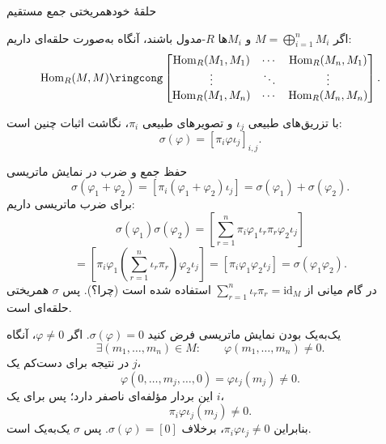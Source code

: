 \begin{frame}[t]{حلقهٔ خودهمریختی جمع مستقیم}
    \label{lec12:endomorphism-matrix}
    \begin{theorem}
        اگر $M=\bigoplus_{i=1}^{n}M_i$ و $M_i$ها $R$-مدول باشند، آنگاه
        به‌صورت حلقه‌ای داریم:
        \[
        \operatorname{Hom}_R(M,M)\ringcong
        \begin{bmatrix}
        \operatorname{Hom}_R(M_1,M_1)&\cdots&\operatorname{Hom}_R(M_n,M_1)\\
        \vdots&\ddots&\vdots\\
        \operatorname{Hom}_R(M_1,M_n)&\cdots&\operatorname{Hom}_R(M_n,M_n)
        \end{bmatrix}.
        \]
    \end{theorem}
    با تزریق‌های طبیعی $\iota_j$ و تصویرهای طبیعی $\pi_i$، نگاشت اثبات چنین است:
    \[
        \sigma(\varphi)=[\pi_i\varphi\iota_j]_{i,j}.
    \]
\end{frame}

\begin{frame}[t]{حفظ جمع و ضرب در نمایش ماتریسی}
    \label{lec12:matrix-homomorphism}
    \[
        \sigma(\varphi_1+\varphi_2)
        =[\pi_i(\varphi_1+\varphi_2)\iota_j]
        =\sigma(\varphi_1)+\sigma(\varphi_2).
    \]
    برای ضرب ماتریسی داریم:
    \[
        \sigma(\varphi_1)\sigma(\varphi_2)
        =\left[\sum_{r=1}^{n}\pi_i\varphi_1\iota_r\pi_r\varphi_2\iota_j\right]
    \]
    \[
        =\left[\pi_i\varphi_1
        \left(\sum_{r=1}^{n}\iota_r\pi_r\right)\varphi_2\iota_j\right]
        =[\pi_i\varphi_1\varphi_2\iota_j]
        =\sigma(\varphi_1\varphi_2).
    \]
    در گام میانی از $\sum_{r=1}^{n}\iota_r\pi_r=\mathrm{id}_M$ استفاده شده است (چرا؟).
    پس $\sigma$ همریختی حلقه‌ای است.
\end{frame}

\begin{frame}[t]{یک‌به‌یک بودن نمایش ماتریسی}
    \label{lec12:matrix-injectivity}
    فرض کنید $\sigma(\varphi)=0$. اگر $\varphi\ne0$، آنگاه
    \[
        \exists(m_1,\ldots,m_n)\in M:
        \qquad\varphi(m_1,\ldots,m_n)\ne0.
    \]
    در نتیجه برای دست‌کم یک $j$،
    \[
        \varphi(0,\ldots,m_j,\ldots,0)=\varphi\iota_j(m_j)\ne0.
    \]
    این بردار مؤلفه‌ای ناصفر دارد؛ پس برای یک $i$،
    \[
        \pi_i\varphi\iota_j(m_j)\ne0.
    \]
    بنابراین $\pi_i\varphi\iota_j\ne0$، برخلاف $\sigma(\varphi)=[0]$.
    پس $\sigma$ یک‌به‌یک است.
\end{frame}

